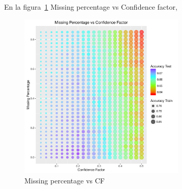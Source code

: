En la figura~\ref{fig:4d} Missing percentage vs Confidence factor,

\begin{figure}
  \centering
  \includegraphics[width = 8cm]{4d.pdf}
  \caption{Missing percentage vs CF}
  \label{fig:4d}
\end{figure}
